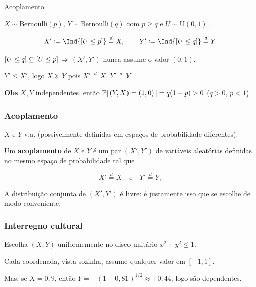 \documentclass[aspectratio=169]{beamer}
\begin{document}
\begin{frame}{Acoplamento}


  \vfill
  
   $X\sim\mathrm{Bernoulli}(p)$,
  $Y\sim\mathrm{Bernoulli}(q)$ com $p\geq q$ \quad e \quad $U\sim\mathrm{U}(0,1)$.
  
  \vfill
  
  \[
    X' \coloneqq  \Ind{\colch{U\leq p}} \stackrel d= X,
    \qquad
    Y' \coloneqq  \Ind{\colch{U\leq q}} \stackrel d= Y.
  \]

  \vfill

  \begin{center}
    $\lbrack U\leq q\rbrack \subseteq \lbrack U\leq p\rbrack$ $\Rightarrow$ $(X',Y')$ nunca
  assume o valor $(0,1)$.
  \end{center}

  \vfill
  
  \begin{center}
    $Y'\leq X'$, logo $X\succeq Y$ pois $X'\overset{d}{=}X$,
    $Y'\overset{d}{=}Y$
  \end{center}

   \vfill

   \textbf{Obs} $X,Y$ independentes, então
   $\ProbE{(Y,X)=(1,0)} = q(1-p) >0$ ($q>0$, $p<1$)
  

\end{frame}
\begin{frame}
  \frametitle{Acoplamento}

  \vfill
  
  $X$ e $Y$ v.a. (possivelmente definidas em espaços de probabilidade
  diferentes).
  
  \vfill
  
  Um \textbf{acoplamento} de $X$ e $Y$ é um par $(X',Y')$ de variáveis
  aleatórias definidas no mesmo espaço de probabilidade tal que
  
  $$X'\overset{d}{=}X \quad\text{e}\quad Y'\overset{d}{=}Y,$$
  
  \vfill
  
  A distribuição conjunta de $(X',Y')$ é livre: é justamente isso que
  se escolhe de modo conveniente.

\end{frame}
\begin{frame}
  \frametitle{Interregno cultural}


  Escolha $(X, Y)$ uniformemente no disco unitário $x^2 + y^2 \leq 1.$

  \vfill
  
  Cada coordenada, vista sozinha, assume qualquer valor em $[-1,1]$.

  \vfill

  Mas, se $X = 0{,}9$, então
  $Y = \pm (1 - 0,81)^{1/2} \approx \pm 0,44$, logo são dependentes.

  \vfill
  
  
  
\end{frame}
\end{document}
